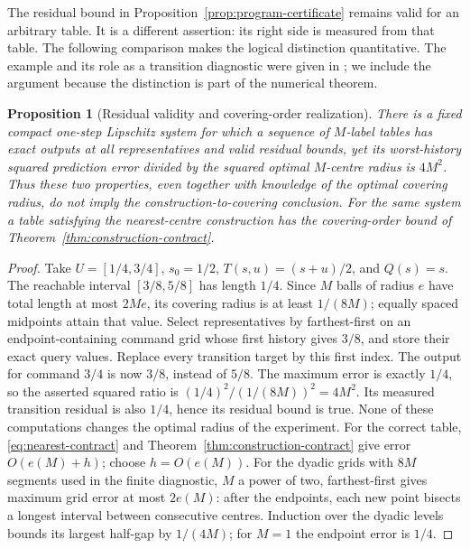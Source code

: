 \documentclass[11pt]{amsart}
\newtheorem{proposition}[theorem]{Proposition}
\theoremstyle{definition}\newtheorem{definition}[theorem]{Definition}
\theoremstyle{remark}\newtheorem{remark}[theorem]{Remark}
\begin{document}
The residual bound in Proposition~\ref{prop:program-certificate} remains
valid for an arbitrary table. It is a different assertion: its right
side is measured from that table. The following comparison makes the
logical distinction quantitative. The example and its role as a
transition diagnostic were given in \cite{RefereeV11Note}; we include
the argument because the distinction is part of the numerical theorem.

\begin{proposition}[Residual validity and covering-order realization]
\label{prop:residual-comparison}
There is a fixed compact one-step Lipschitz system for which a sequence
of $M$-label tables has exact outputs at all representatives and valid
residual bounds, yet its worst-history squared prediction error divided
by the squared optimal $M$-centre radius is $4M^2$. Thus these two
properties, even together with knowledge of the optimal covering radius,
do not imply the construction-to-covering conclusion. For the same
system a table satisfying the nearest-centre construction has the
covering-order bound of Theorem~\ref{thm:construction-contract}.
\end{proposition}
\begin{proof}
Take $U=[1/4,3/4]$, $s_0=1/2$, $T(s,u)=(s+u)/2$, and $Q(s)=s$.
The reachable interval $[3/8,5/8]$ has length $1/4$. Since $M$ balls
of radius $e$ have total length at most $2Me$, its covering radius
is at least $1/(8M)$; equally spaced midpoints attain that value.
Select representatives by farthest-first on an endpoint-containing
command grid whose first history gives $3/8$, and store their exact
query values. Replace every transition target by this first index.
The output for command $3/4$ is now $3/8$, instead of $5/8$.
The maximum error is exactly $1/4$, so the asserted squared ratio is
$(1/4)^2/(1/(8M))^2=4M^2$. Its measured transition residual is also
$1/4$, hence its residual bound is true. None of these computations
changes the optimal radius of the experiment. For the correct table,
\eqref{eq:nearest-contract} and Theorem~\ref{thm:construction-contract}
give error $O(e(M)+h)$; choose $h=O(e(M))$. For the dyadic grids with
$8M$ segments used in the finite diagnostic, $M$ a power of two,
farthest-first gives maximum grid error at most $2e(M)$: after the
endpoints, each new point bisects a longest interval between consecutive
centres. Induction over the dyadic levels bounds its largest half-gap
by $1/(4M)$; for $M=1$ the endpoint error is $1/4$.
\end{proof}
\end{document}
